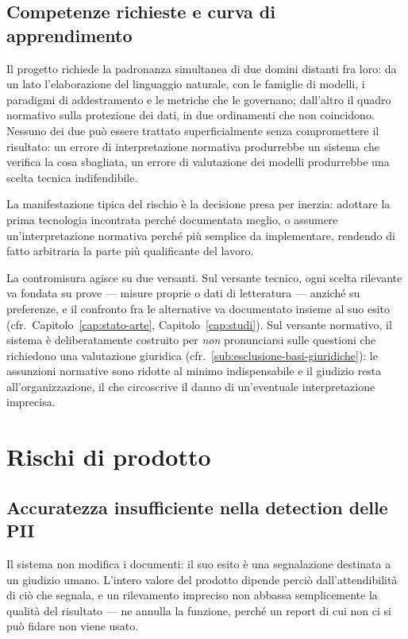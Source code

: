 \subsection{Competenze richieste e curva di apprendimento}
\label{sub:rischio-competenze}
Il progetto richiede la padronanza simultanea di due domini distanti fra loro: da un lato l'elaborazione del linguaggio naturale, con le famiglie di modelli, i paradigmi di addestramento e le metriche che le governano; dall'altro il quadro normativo sulla protezione dei dati, in due ordinamenti che non coincidono. Nessuno dei due può essere trattato superficialmente senza compromettere il risultato: un errore di interpretazione normativa produrrebbe un sistema che verifica la cosa sbagliata, un errore di valutazione dei modelli produrrebbe una scelta tecnica indifendibile. \medskip

La manifestazione tipica del rischio è la decisione presa per inerzia: adottare la prima tecnologia incontrata perché documentata meglio, o assumere un'interpretazione normativa perché più semplice da implementare, rendendo di fatto arbitraria la parte più qualificante del lavoro. \medskip

La contromisura agisce su due versanti. Sul versante tecnico, ogni scelta rilevante va fondata su prove --- misure proprie o dati di letteratura --- anziché su preferenze, e il confronto fra le alternative va documentato insieme al suo esito (cfr.~Capitolo~\ref{cap:stato-arte}, Capitolo~\ref{cap:studi}). Sul versante normativo, il sistema è deliberatamente costruito per \emph{non} pronunciarsi sulle questioni che richiedono una valutazione giuridica (cfr.~\ref{sub:esclusione-basi-giuridiche}): le assunzioni normative sono ridotte al minimo indispensabile e il giudizio resta all'organizzazione, il che circoscrive il danno di un'eventuale interpretazione imprecisa.


\section{Rischi di prodotto}
\label{sec:rischi-prodotto}

\subsection{Accuratezza insufficiente nella detection delle PII}
\label{sub:rischio-accuratezza}
Il sistema non modifica i documenti: il suo esito è una segnalazione destinata a un giudizio umano. L'intero valore del prodotto dipende perciò dall'attendibilità di ciò che segnala, e un rilevamento impreciso non abbassa semplicemente la qualità del risultato --- ne annulla la funzione, perché un report di cui non ci si può fidare non viene usato. \medskip

